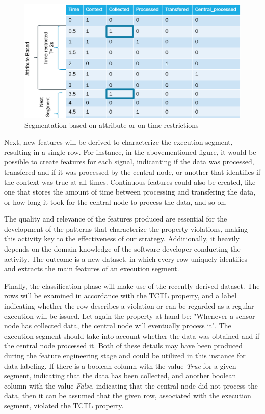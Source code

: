 \begin{figure}[!h]
	\centering
	\includegraphics[width=0.999\textwidth, keepaspectratio]{img/Segmentation2.png}
	\caption{Segmentation based on attribute or on time restrictions}
	\label{fig:Segmentation}
\end{figure}

Next, new features will be derived to characterize the execution segment, resulting in a single row. For instance, in the abovementioned figure, it would be possible to create features for each signal, indicanting if the data was processed, transfered and if it was processed by the central node, or another that identifies if the context was true at all times. Continuous features could also be created, like one that stores the amount of time between processing and transfering the data, or how long it took for the central node to process the data, and so on. 

The quality and relevance of the features produced are essential for the development of the patterns that characterize the property violations, making this activity key to the effectiveness of our strategy. Additionally, it heavily depends on the domain knowledge of the software developer conducting the activity. The outcome is a new dataset, in which every row uniquely identifies and extracts the main features of an execution segment.

Finally, the classification phase will make use of the recently derived dataset. The rows will be examined in accordance with the TCTL property, and a label indicating whether the row describes a violation or can be regarded as a regular execution will be issued. Let again the property at hand be: "Whenever a sensor node has collected data, the central node will eventually process it". The execution segment should take into account whether the data was obtained and if the central node processed it. Both of these details may have been produced during the feature engineering stage and could be utilized in this instance for data labeling. If there is a boolean column with the value \textit{True} for a given segment, indicating that the data has been collected, and another boolean column with the value \textit{False}, indicating that the central node did not process the data, then it can be assumed that the given row, associated with the execution segment, violated the TCTL property.

